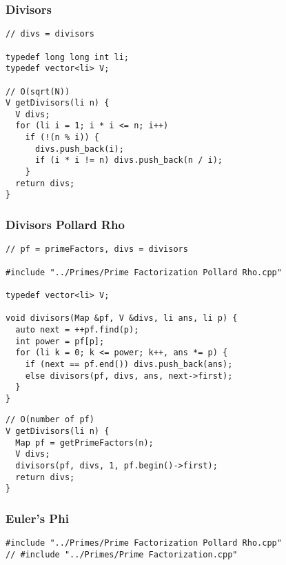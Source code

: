 \documentclass[twoside]{article}
\newcommand{\fileTitleStyle}{\large\underline}
\begin{document}
\begin{multicols*}{2}
\begin{verbatim}
\end{verbatim}

\subsubsectionfont{\centering\bfseries\Large}
\subsubsectionfont{\fileTitleStyle}
\subsubsection*{Divisors}
\begin{verbatim}
// divs = divisors

typedef long long int li;
typedef vector<li> V;

// O(sqrt(N))
V getDivisors(li n) {
  V divs;
  for (li i = 1; i * i <= n; i++)
    if (!(n % i)) {
      divs.push_back(i);
      if (i * i != n) divs.push_back(n / i);
    }
  return divs;
}
\end{verbatim}

\subsubsectionfont{\centering\bfseries\Large}
\subsubsectionfont{\fileTitleStyle}
\subsubsection*{Divisors Pollard Rho}
\begin{verbatim}
// pf = primeFactors, divs = divisors

#include "../Primes/Prime Factorization Pollard Rho.cpp"

typedef vector<li> V;

void divisors(Map &pf, V &divs, li ans, li p) {
  auto next = ++pf.find(p);
  int power = pf[p];
  for (li k = 0; k <= power; k++, ans *= p) {
    if (next == pf.end()) divs.push_back(ans);
    else divisors(pf, divs, ans, next->first);
  }
}
\end{verbatim}
\vspace{-12pt}
\begin{verbatim}
// O(number of pf)
V getDivisors(li n) {
  Map pf = getPrimeFactors(n);
  V divs;
  divisors(pf, divs, 1, pf.begin()->first);
  return divs;
}
\end{verbatim}

\subsubsectionfont{\centering\bfseries\Large}
\subsubsectionfont{\fileTitleStyle}
\subsubsection*{Euler's Phi}
\begin{verbatim}
#include "../Primes/Prime Factorization Pollard Rho.cpp"
// #include "../Primes/Prime Factorization.cpp"


\end{verbatim}
\end{multicols*}
\end{document}
